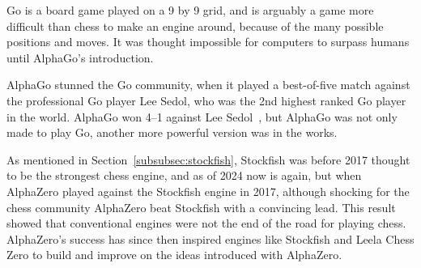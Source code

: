 Go is a board game played on a 9 by 9 grid, and is arguably a game more difficult than chess to make an engine around,
because of the many possible positions and moves.
It was thought impossible for computers to surpass humans until AlphaGo's introduction.

AlphaGo stunned the Go community, when it played a best-of-five match against the professional
Go player Lee Sedol, who was the 2nd highest ranked Go player in the world.
AlphaGo won 4--1 against Lee Sedol~\cite{alpha-go-zero}, but AlphaGo was not only made to play Go, another more powerful
version was in the works.

As mentioned in Section~\ref{subsubsec:stockfish}, Stockfish was before 2017 thought to be the strongest chess engine,
and as of 2024 now is again, but when AlphaZero played against the Stockfish engine in 2017, although shocking for the
chess community AlphaZero beat Stockfish with a convincing lead.
This result showed that conventional engines were not the end of the road for playing chess.
AlphaZero's success has since then inspired engines like Stockfish and Leela Chess Zero to build and improve on the ideas
introduced with AlphaZero.
